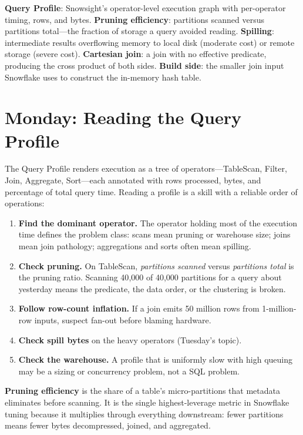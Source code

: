 \begin{keyterms}
\textbf{Query Profile}: Snowsight's operator-level execution graph with per-operator timing, rows, and bytes.\quad
\textbf{Pruning efficiency}: partitions scanned versus partitions total---the fraction of storage a query avoided reading.\quad
\textbf{Spilling}: intermediate results overflowing memory to local disk (moderate cost) or remote storage (severe cost).\quad
\textbf{Cartesian join}: a join with no effective predicate, producing the cross product of both sides.\quad
\textbf{Build side}: the smaller join input Snowflake uses to construct the in-memory hash table.
\end{keyterms}

\section{Monday: Reading the Query Profile}
The Query Profile renders execution as a tree of operators---TableScan, Filter, Join, Aggregate, Sort---each annotated with rows processed, bytes, and percentage of total query time. Reading a profile is a skill with a reliable order of operations:

\begin{enumerate}
    \item \textbf{Find the dominant operator.} The operator holding most of the execution time defines the problem class: scans mean pruning or warehouse size; joins mean join pathology; aggregations and sorts often mean spilling.
    \item \textbf{Check pruning.} On TableScan, \emph{partitions scanned} versus \emph{partitions total} is the pruning ratio. Scanning 40{,}000 of 40{,}000 partitions for a query about yesterday means the predicate, the data order, or the clustering is broken.
    \item \textbf{Follow row-count inflation.} If a join emits 50 million rows from 1-million-row inputs, suspect fan-out before blaming hardware.
    \item \textbf{Check spill bytes} on the heavy operators (Tuesday's topic).
    \item \textbf{Check the warehouse.} A profile that is uniformly slow with high queuing may be a sizing or concurrency problem, not a SQL problem.
\end{enumerate}

\begin{definitionbox}
\textbf{Pruning efficiency} is the share of a table's micro-partitions that metadata eliminates before scanning. It is the single highest-leverage metric in Snowflake tuning because it multiplies through everything downstream: fewer partitions means fewer bytes decompressed, joined, and aggregated.
\end{definitionbox}

